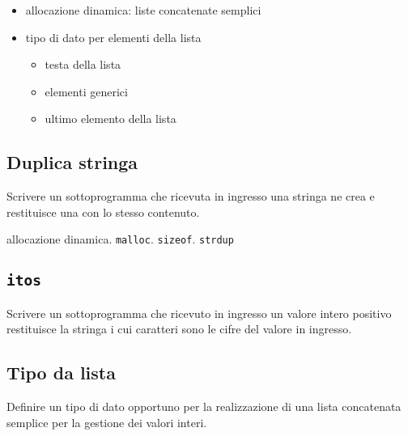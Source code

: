 \begin{itemize}
\item allocazione dinamica: liste concatenate semplici
\item tipo di dato per elementi della lista
\begin{itemize}
	\item testa della lista
	\item elementi generici
	\item ultimo elemento della lista
\end{itemize}
\end{itemize}

\subsection{Duplica stringa}
Scrivere un sottoprogramma che ricevuta in ingresso una stringa ne crea e restituisce una con lo stesso contenuto.

\begin{tags}
allocazione dinamica. \texttt{malloc}. \texttt{sizeof}. \texttt{strdup}
\end{tags}


\subsection{\texttt{itos}}
Scrivere un sottoprogramma che ricevuto in ingresso un valore intero positivo restituisce la stringa i cui caratteri sono le cifre del valore in ingresso.



\subsection{Tipo da lista}
Definire un tipo di dato opportuno per la realizzazione di una lista concatenata semplice per la gestione dei valori interi.

